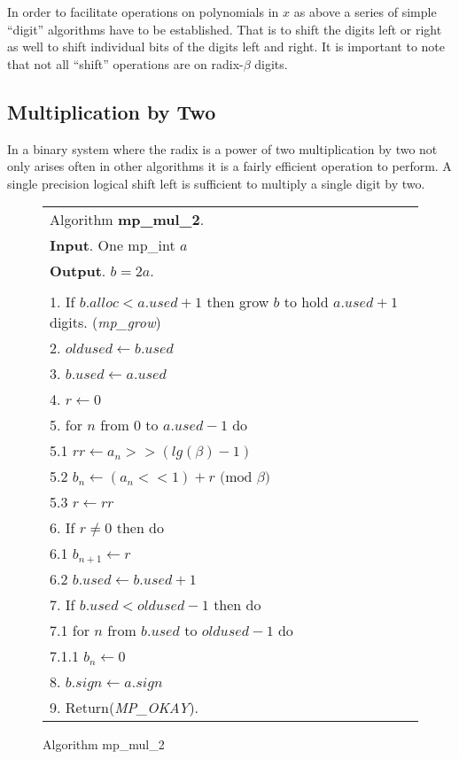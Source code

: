 \documentclass[b5paper]{book}
\begin{document}
In order to facilitate operations on polynomials in $x$ as above a series of simple ``digit'' algorithms have to be established.  That is to shift
the digits left or right as well to shift individual bits of the digits left and right.  It is important to note that not all ``shift'' operations
are on radix-$\beta$ digits.  

\subsection{Multiplication by Two}

In a binary system where the radix is a power of two multiplication by two not only arises often in other algorithms it is a fairly efficient 
operation to perform.  A single precision logical shift left is sufficient to multiply a single digit by two.  

\newpage\begin{figure}[!here]
\begin{small}
\begin{center}
\begin{tabular}{l}
\hline Algorithm \textbf{mp\_mul\_2}. \\
\textbf{Input}.   One mp\_int $a$ \\
\textbf{Output}.  $b = 2a$. \\
\hline \\
1.  If $b.alloc < a.used + 1$ then grow $b$ to hold $a.used + 1$ digits.  (\textit{mp\_grow}) \\
2.  $oldused \leftarrow b.used$ \\
3.  $b.used \leftarrow a.used$ \\
4.  $r \leftarrow 0$ \\
5.  for $n$ from 0 to $a.used - 1$ do \\
\hspace{3mm}5.1  $rr \leftarrow a_n >> (lg(\beta) - 1)$ \\
\hspace{3mm}5.2  $b_n \leftarrow (a_n << 1) + r \mbox{ (mod }\beta\mbox{)}$ \\
\hspace{3mm}5.3  $r \leftarrow rr$ \\
6.  If $r \ne 0$ then do \\
\hspace{3mm}6.1  $b_{n + 1} \leftarrow r$ \\
\hspace{3mm}6.2  $b.used \leftarrow b.used + 1$ \\
7.  If $b.used < oldused - 1$ then do \\
\hspace{3mm}7.1  for $n$ from $b.used$ to $oldused - 1$ do \\
\hspace{6mm}7.1.1  $b_n \leftarrow 0$ \\
8.  $b.sign \leftarrow a.sign$ \\
9.  Return(\textit{MP\_OKAY}).\\
\hline
\end{tabular}
\end{center}
\end{small}
\caption{Algorithm mp\_mul\_2}
\end{figure}
\end{document}
